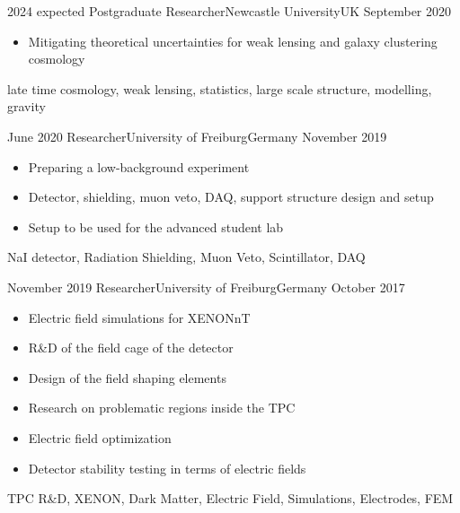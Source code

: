 
\begin{experiences}

  \experience
    {2024 expected}   {Postgraduate Researcher}{Newcastle University}{UK}
    {September 2020} {
                      \begin{itemize}
                        \item Mitigating theoretical uncertainties for weak lensing
and galaxy clustering cosmology
                      \end{itemize}
                    }
                    {late time cosmology, weak lensing, statistics, large scale structure, modelling, gravity}

  \emptySeparator 
  
  \experience
    {June 2020}   {Researcher}{University of Freiburg}{Germany}
    {November 2019} {
                      \begin{itemize}
                        \item Preparing a low-background experiment    
                        \item Detector, shielding, muon veto, DAQ, support structure design and setup 
                        \item Setup to be used for the advanced student lab
                      \end{itemize}
                    }
                    {NaI detector, Radiation Shielding, Muon Veto, Scintillator, DAQ}
  \emptySeparator
  
   \experience
    {November 2019}   {Researcher}{University of Freiburg}{Germany}
    {October 2017} {
                      \begin{itemize}
                        \item Electric field simulations for XENONnT
                        \item R\&D of the field cage of the detector
                        \item Design of the field shaping elements
                        \item Research on problematic regions inside the TPC
                        \item Electric field optimization
                        \item Detector stability testing in terms of electric fields
                      \end{itemize}
                    }
                    {TPC R\&D, XENON, Dark Matter, Electric Field, Simulations, Electrodes, FEM}
  
\end{experiences}
